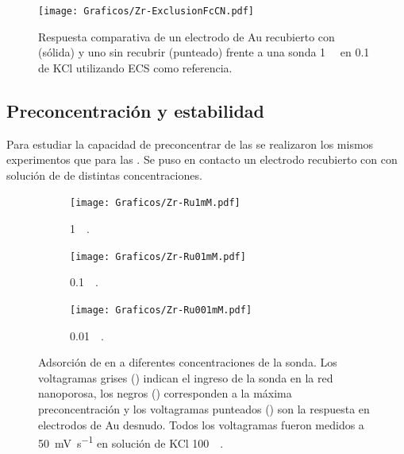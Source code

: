 				\begin{figure}[ht]
				\centering
		 	    \texttt{[image: Graficos/Zr-ExclusionFcCN.pdf]}
		        \caption[Exclusión electrostática en \pdmZ]{Respuesta comparativa de un electrodo de Au recubierto con \pdmZ\space (sólida) y uno sin recubrir (punteado) frente a una sonda \ferroferri\space \SI{1}{\milli\Molar} en \SI{0.1}{\Molar} de KCl utilizando ECS como referencia.}
		        \label{fig:fcn-zr}
		      	\end{figure} 
	 
	 \subsection{Preconcentración y estabilidad}\label{sub:pcirc}

		 	Para estudiar la capacidad de preconcentrar de las \pdmZ\space se realizaron los mismos experimentos que para las \pdmF. Se puso en contacto un electrodo recubierto con \pdmZ\space con solución de \ru\space de distintas concentraciones. 


	 			\begin{figure}[th]
			   	    \begin{subfigure}[t]{0.325\textwidth}
			        	\texttt{[image: Graficos/Zr-Ru1mM.pdf]}
			        	\caption{\aminorutenio\space \SI{1}{\milli\Molar}.}
			         	\label{fig:Zr-Ru1mM}
			     		\end{subfigure}
			   	    \begin{subfigure}[t]{0.325\textwidth}
			        	\texttt{[image: Graficos/Zr-Ru01mM.pdf]}
			       		\caption{\aminorutenio\space \SI{0.1}{\milli\Molar}.}
			         	\label{fig:Zr-Ru0.1mM}
			     		\end{subfigure}
		     		\begin{subfigure}[t]{0.325\textwidth}
			        	\texttt{[image: Graficos/Zr-Ru001mM.pdf]}
			       		\caption{\aminorutenio\space \SI{0.01}{\milli\Molar}.}
			         	\label{fig:Zr-Ru0.01mM}
			     		\end{subfigure}
			     		\caption[Preconcentración de \aminorutenio\space en \pdmZ]{Adsorción de \ru\space en \pdmZ\space a diferentes concentraciones de la sonda. Los voltagramas grises (\usebox{\gris}) indican el ingreso de la sonda en la red nanoporosa, los negros (\usebox{\negro}) corresponden a la máxima preconcentración y los voltagramas punteados (\usebox{\punteado}) son la respuesta en electrodos de Au desnudo. Todos los voltagramas fueron medidos a \SI{50}{\milli\volt\per\second} en solución de KCl \SI{100}{\milli\Molar}.}
			     		\label{fig:precon_ZR}
		     		\end{figure}
		
